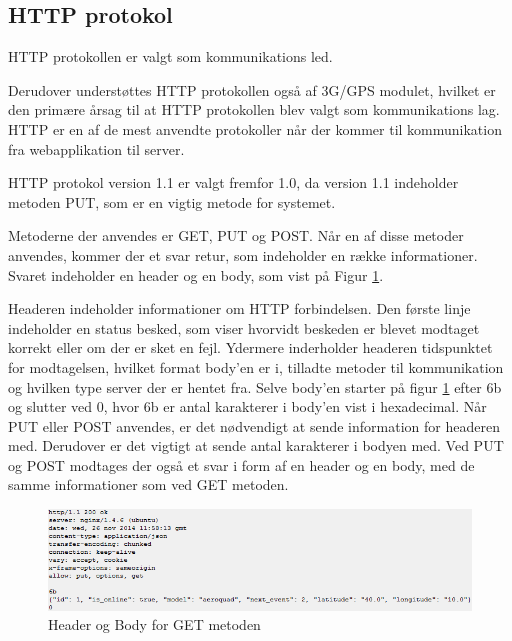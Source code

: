 \subsection{HTTP protokol}
HTTP protokollen er valgt som kommunikations led. 

Derudover understøttes HTTP protokollen også af 3G/GPS modulet, hvilket er den primære årsag til at HTTP protokollen blev valgt som kommunikations lag.
HTTP er en af de mest anvendte protokoller når der kommer til kommunikation fra webapplikation til server. 

 
HTTP protokol version 1.1 er valgt fremfor 1.0, da version 1.1 indeholder metoden PUT, som er en vigtig metode for systemet.

Metoderne der anvendes er GET, PUT og POST. Når en af disse metoder anvendes, kommer der et svar retur, som indeholder en række informationer.
Svaret indeholder en header og en body, som vist på Figur \ref{fig:headerbodyget}. 

Headeren indeholder informationer om HTTP forbindelsen. Den første linje indeholder en status besked, som viser hvorvidt beskeden er blevet modtaget korrekt eller om der er sket en fejl. Ydermere inderholder headeren tidspunktet for modtagelsen, hvilket format body'en er i, tilladte metoder til kommunikation og hvilken type server der er hentet fra. Selve body'en starter på figur \ref{fig:headerbodyget} efter 6b og slutter ved 0, hvor 6b er antal karakterer i body'en vist i hexadecimal. Når PUT eller POST anvendes, er det nødvendigt at sende information for headeren med. Derudover er det vigtigt at sende antal karakterer i bodyen med. Ved PUT og POST modtages der også et svar i form af en header og en body, med de samme informationer som ved GET metoden. 
\begin{figure}[H]
	\centering
	\includegraphics[width=1\textwidth]{Billeder/header_body_get.png}
	\caption{Header og Body for GET metoden}
	\label{fig:headerbodyget}
\end{figure}